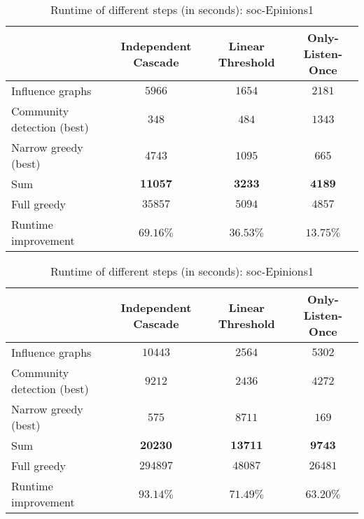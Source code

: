 \documentclass[pdflatex,sn-mathphys-num]{sn-jnl}
\begin{document}
\begin{table}[ht]

\caption{Runtime of different steps (in seconds): cit-HepPh}
\label{table_runtimes_big_cithep}
\begin{tabular}{@{}lccc@{}}
\toprule
& Independent Cascade & Linear Threshold & Only-Listen-Once \\
\midrule
Influence graphs & $5966$ & $1654$ & $2181$ \\
Community detection (best)\footnotemark[4] & $348$ & $484$ & $1343$ \\
Narrow greedy (best)\footnotemark[4] & $4743$ & $1095$ & $665$ \\
\midrule
Sum & $\mathbf{11057}$ & $\mathbf{3233}$ & $\mathbf{4189}$ \\
Full greedy & $35857$ & $5094$ & $4857$ \\
\midrule
Runtime improvement & $69.16\%$ & $36.53\%$ & $13.75\%$ \\
\midrule
\end{tabular}

\vspace{7.5mm}

\caption{Runtime of different steps (in seconds): soc-Epinions1}
\label{table_runtimes_big_socepinions}
\begin{tabular}{@{}lccc@{}}
\toprule
& Independent Cascade & Linear Threshold & Only-Listen-Once \\
\midrule
Influence graphs & $10443$ & $2564$ & $5302$ \\
Community detection (best)\footnotemark[4] & $9212$ & $2436$ & $4272$ \\
Narrow greedy (best)\footnotemark[4] & $575$ & $8711$ & $169$ \\
\midrule
Sum & $\mathbf{20230}$ & $\mathbf{13711}$ & $\mathbf{9743}$ \\
Full greedy & $294897$ & $48087$ & $26481$ \\
\midrule
Runtime improvement & $93.14\%$ & $71.49\%$ & $63.20\%$ \\
\midrule
\end{tabular}


\end{table}
\end{document}
